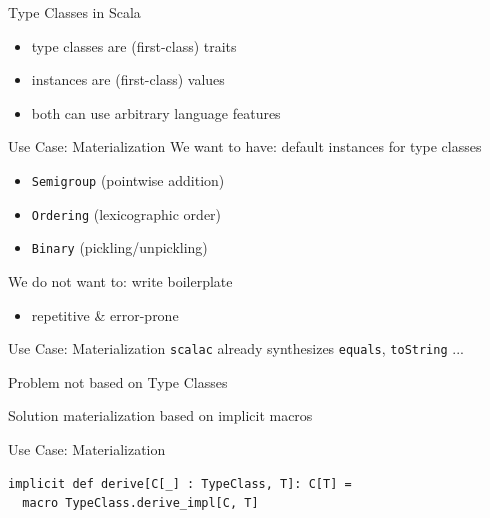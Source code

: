 \documentclass{beamer}
\begin{document}
\begin{frame}{Type Classes in Scala}
  \begin{itemize}
    \item type classes are (first-class) traits
    \item instances are (first-class) values
    \item<visible@2> both can use arbitrary language features
  \end{itemize}
\end{frame}

\begin{frame}{Use Case: Materialization}
  We want to have: default instances for type classes
  \begin{itemize}
    \item \texttt{Semigroup} (pointwise addition)
    \item \texttt{Ordering} (lexicographic order)
    \item \texttt{Binary} (pickling/unpickling)
  \end{itemize}

  \vspace{1em}
  We do not want to: write boilerplate
  \begin{itemize}
    \item repetitive \& error-prone
  \end{itemize}
\end{frame}

\begin{frame}{Use Case: Materialization}
  \texttt{scalac} already synthesizes \texttt{equals}, \texttt{toString} ...

  \vspace{1em}
  \begin{alertblock}{Problem}
    not based on Type Classes
  \end{alertblock}

  \vspace{1em}
  \begin{exampleblock}{Solution}
    materialization based on implicit macros
  \end{exampleblock}
\end{frame}

\begin{frame}[fragile]{Use Case: Materialization}
  \begin{verbatim}
implicit def derive[C[_] : TypeClass, T]: C[T] =
  macro TypeClass.derive_impl[C, T]
  \end{verbatim}
\end{frame}
\end{document}
